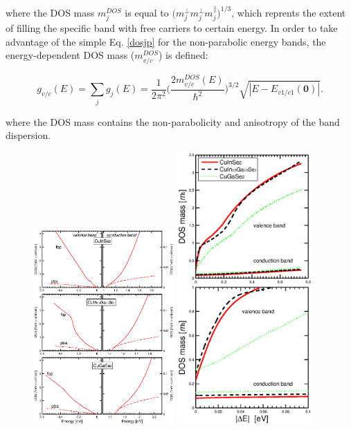 \documentclass[a4paper, 12pt, titlepage,oneside,drop]{kthesis}
\begin{document}
where the DOS mass $m_j^{DOS}$ is equal to $\big( m_j^{\perp}m_j^{\perp}m_j^{\parallel} \big)^{1/3}$, which reprents the extent of filling the specific band with free carriers to certain energy. 
In order to take advantage of the simple Eq. \ref{dosjp} for the non-parabolic energy bands, the energy-dependent DOS mass ($m_{v/c}^{DOS}$) is defined:

\begin{equation}\label{dosmass}
 g_{v/c}(E) = \sum \limits_j g_j(E) = \frac{1}{2\pi^2} \big(\frac{2m_{v/c}^{DOS}(E)}{\hbar^2}\big)^{3/2} \sqrt{|E-E_{v1/c1}(\textbf{0})|}.
\end{equation}

where the DOS mass contains the non-parabolicity and anisotropy of the band dispersion.

 \begin{figure}[H]
  \begin{center}
            \includegraphics[width=0.48\textwidth,clip]{paper2figure4}
            \includegraphics[width=0.46\textwidth,clip]{paper2figure6}

\end{center}
\end{figure}
\end{document}
